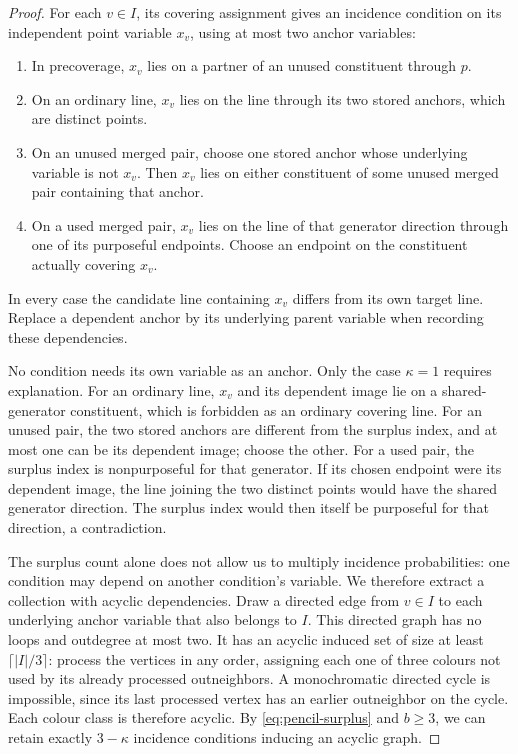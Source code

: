 \begin{proof}
For each $v\in I$, its covering assignment gives an incidence condition
on its independent point variable $x_v$, using at most two anchor
variables:
\begin{enumerate}[label=(\alph*)]
\item In precoverage, $x_v$ lies on a partner of an unused constituent
through $p$.
\item On an ordinary line, $x_v$ lies on the line through its two stored
anchors, which are distinct points.
\item On an unused merged pair, choose one stored anchor whose underlying
variable is not $x_v$.  Then $x_v$ lies on either constituent of some
unused merged pair containing that anchor.
\item On a used merged pair, $x_v$ lies on the line of that generator
direction through one of its purposeful endpoints.  Choose an endpoint
on the constituent actually covering $x_v$.
\end{enumerate}
In every case the candidate line containing $x_v$ differs from its own
target line.  Replace a dependent anchor by its underlying parent
variable when recording these dependencies.

No condition needs its own variable as an anchor.  Only the case
$\kappa=1$ requires explanation.  For an ordinary line, $x_v$ and its
dependent image lie on a shared-generator constituent, which is forbidden
as an ordinary covering line.  For an unused pair, the two stored anchors
are different from the surplus index, and at most one can be its
dependent image; choose the other.  For a used pair, the surplus index is
nonpurposeful for that generator.  If its chosen endpoint were its
dependent image, the line joining the two distinct points would have the
shared generator direction.  The surplus index would then itself be
purposeful for that direction, a contradiction.

The surplus count alone does not allow us to multiply incidence
probabilities: one condition may depend on another condition's variable.
We therefore extract a collection with acyclic dependencies.  Draw a
directed edge from $v\in I$ to each underlying anchor variable that also
belongs to $I$.  This directed graph has no loops and outdegree
at most two.  It has an acyclic induced set of size at least
$\lceil |I|/3\rceil$: process the vertices in any order, assigning each
one of three colours not used by its already processed outneighbors.  A
monochromatic directed cycle is impossible, since its last processed
vertex has an earlier outneighbor on the cycle.  Each colour class is
therefore acyclic.  By \eqref{eq:pencil-surplus} and $b\ge3$, we can retain
exactly $3-\kappa$ incidence conditions inducing an acyclic graph.


\end{proof}
